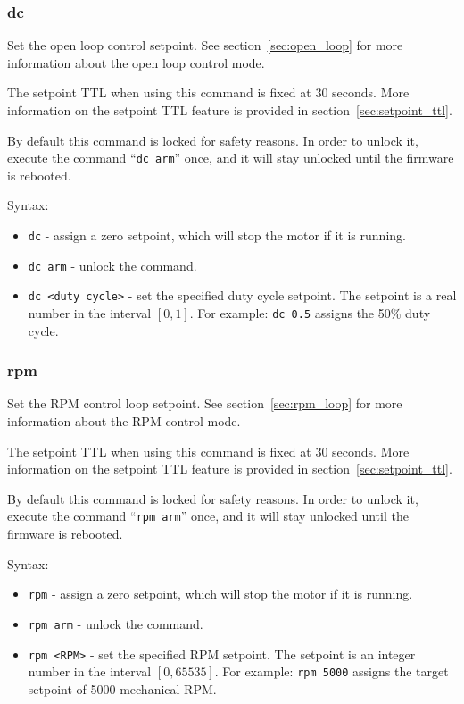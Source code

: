 \documentclass{zubaxdoc}
\begin{document}
\subsubsection{dc}

Set the open loop control setpoint.
See section~\ref{sec:open_loop} for more information about the open loop control mode.

The setpoint TTL when using this command is fixed at 30 seconds.
More information on the setpoint TTL feature is provided in section~\ref{sec:setpoint_ttl}.

By default this command is locked for safety reasons.
In order to unlock it, execute the command
``\verb|dc arm|'' once, and it will stay unlocked until the firmware is rebooted.

Syntax:
\begin{itemize}
\item \verb|dc| - assign a zero setpoint, which will stop the motor if it is running.
\item \verb|dc arm| - unlock the command.
\item \verb|dc <duty cycle>| - set the specified duty cycle setpoint.
The setpoint is a real number in the interval $\left[0, 1\right]$.
For example: \verb|dc 0.5| assigns the 50\% duty cycle.
\end{itemize}

\subsubsection{rpm}

Set the RPM control loop setpoint.
See section~\ref{sec:rpm_loop} for more information about the RPM control mode.

The setpoint TTL when using this command is fixed at 30 seconds.
More information on the setpoint TTL feature is provided in section~\ref{sec:setpoint_ttl}.

By default this command is locked for safety reasons.
In order to unlock it, execute the command
``\verb|rpm arm|'' once, and it will stay unlocked until the firmware is rebooted.

Syntax:
\begin{itemize}
\item \verb|rpm| - assign a zero setpoint, which will stop the motor if it is running.
\item \verb|rpm arm| - unlock the command.
\item \verb|rpm <RPM>| - set the specified RPM setpoint.
The setpoint is an integer number in the interval $\left[0, 65535\right]$.
For example: \verb|rpm 5000| assigns the target setpoint of 5000 mechanical RPM.
\end{itemize}
\end{document}
